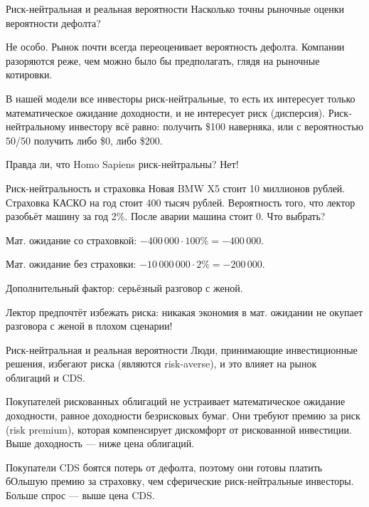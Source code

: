 \documentclass{beamer}
\begin{document}
\begin{frame}{Риск-нейтральная и реальная вероятности}
\justify
Насколько точны рыночные оценки вероятности дефолта?

\vspace{\baselineskip}
Не особо. Рынок почти всегда \alert{переоценивает} вероятность дефолта. Компании разоряются \alert{реже}, чем можно было бы предполагать, глядя на рыночные котировки.

\vspace{\baselineskip}
В нашей модели все инвесторы риск-нейтральные, то есть их интересует только математическое ожидание доходности, и не интересует риск (дисперсия). Риск-нейтральному инвестору всё равно: получить \$100 наверняка, или с вероятностью 50/50 получить либо \$0, либо \$200.

\vspace{\baselineskip}
Правда ли, что Homo Sapiens риск-нейтральны? Нет!
\end{frame}



\begin{frame}{Риск-нейтральность и страховка}
\justify
Новая BMW X5 стоит 10 миллионов рублей. Страховка КАСКО на год стоит 400 тысяч рублей. Вероятность того, что лектор разобьёт машину за год 2\%. После аварии машина стоит 0. Что выбрать?

\justify
Мат. ожидание со страховкой: $-400\,000 \cdot 100\% = -400\,000$.

\justify
Мат. ожидание без страховки: $-10\,000\,000 \cdot 2\% = -200\,000$.

Дополнительный фактор: серьёзный разговор с женой.

\justify
Лектор предпочтёт избежать риска: никакая экономия в мат. ожидании не окупает
разговора с женой в плохом сценарии!
\end{frame}



\begin{frame}{Риск-нейтральная и реальная вероятности}
\justify
Люди, принимающие инвестиционные решения, избегают риска (являются risk-averse), и это влияет на рынок облигаций и CDS.

\justify
Покупателей рискованных облигаций не устраивает математическое ожидание доходности, равное доходности безрисковых бумаг. Они требуют премию за риск (risk premium), которая компенсирует дискомфорт от рискованной инвестиции. Выше доходность --- ниже цена облигаций.

\justify
Покупатели CDS боятся потерь от дефолта, поэтому они готовы платить бОльшую премию за страховку, чем сферические риск-нейтральные инвесторы. Больше спрос --- выше цена CDS.
\end{frame}
\end{document}
